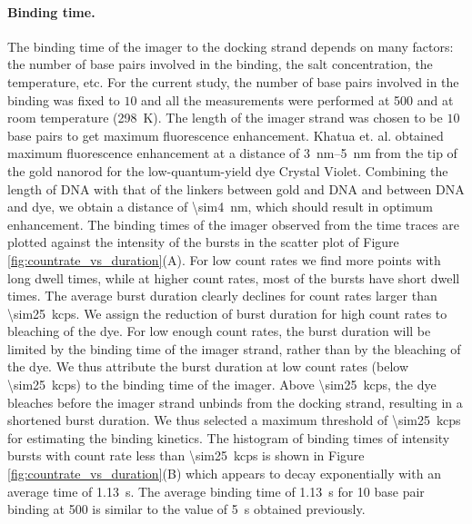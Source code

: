 \paragraph{Binding time.}
The binding time of the imager to the docking strand depends on many factors: the number of base pairs involved in the binding, the salt concentration, the temperature, etc.
For the current study, the number of base pairs involved in the binding was fixed to $10$ and all the measurements were performed at \SI{500}{\mM}  and at room temperature (\SI{298}{\kelvin}).
The length of the imager strand was chosen to be $10$ base pairs to get maximum fluorescence enhancement.
Khatua et. al. obtained maximum fluorescence enhancement at a distance of \SIrange{3}{5}{\nm} from the tip of the gold nanorod for the low-quantum-yield dye Crystal Violet.\cite{khatua2014resonant}
Combining the length of DNA with that of the linkers between gold and DNA and between DNA and dye, we obtain a distance of \SI{\sim4}{\nm}, which should result in optimum enhancement.
The binding times of the imager observed from the time traces are plotted against the intensity of the bursts in the scatter plot of Figure \ref{fig:countrate_vs_duration}(A).
For low count rates we find more points with long dwell times, while at higher count rates, most of the bursts have short dwell times. 
The average burst duration clearly declines for count rates larger than \SI{\sim25}{kcps}.
We assign the reduction of burst duration for high count rates to bleaching of the dye. For low enough count rates, the burst duration will be limited by the binding time of the imager strand, rather than by the bleaching of the dye. We thus attribute the burst duration at low count rates (below \SI{\sim25}{kcps}) to the binding time of the imager.
Above \SI{\sim25}{kcps}, the dye bleaches before the imager strand unbinds from the docking strand, resulting in a shortened burst duration. We thus selected a maximum threshold of \SI{\sim25}{kcps} for estimating the binding kinetics. The histogram of binding times of intensity bursts with count rate less than \SI{\sim25}{kcps} is shown in Figure \ref{fig:countrate_vs_duration}(B) which appears to decay exponentially with an average time of \SI{1.13}{\s}. The average binding time of \SI{1.13}{\s} for 10 base pair binding at \SI{500}{\mM}  is similar to the value of \SI{5}{\s} obtained previously.\cite{jungmann2010singlemolecule}

